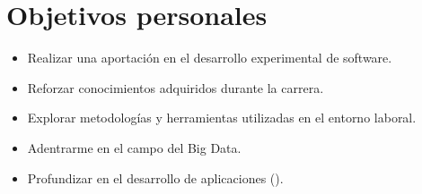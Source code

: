 \section{Objetivos personales}\label{objetivos-personales}

\begin{itemize}
\tightlist
\item
  Realizar una aportación en el desarrollo experimental de software.
\item
  Reforzar conocimientos adquiridos durante la carrera.
\item
  Explorar metodologías y herramientas utilizadas en el entorno laboral.
\item
  Adentrarme en el campo del Big Data.
\item
  Profundizar en el desarrollo de aplicaciones ().
\end{itemize}
